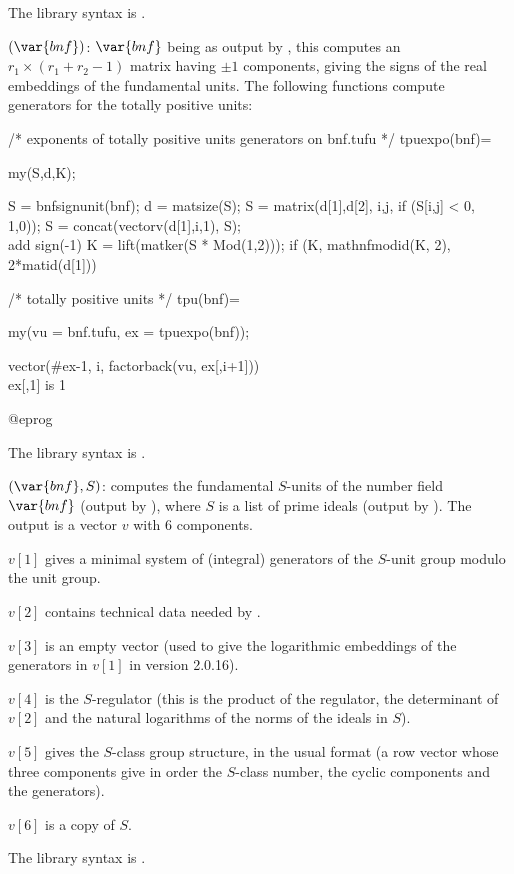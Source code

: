 The library syntax is .

$(\var{bnf})$: \label{se:bnfsignunit}$\var{bnf}$ being as output by
, this computes an $r_1\times(r_1+r_2-1)$ matrix having $\pm1$
components, giving the signs of the real embeddings of the fundamental units.
The following functions compute generators for the totally positive units:

\bprog
/* exponents of totally positive units generators on bnf.tufu */
tpuexpo(bnf)=
{ my(S,d,K);

  S = bnfsignunit(bnf); d = matsize(S);
  S = matrix(d[1],d[2], i,j, if (S[i,j] < 0, 1,0));
  S = concat(vectorv(d[1],i,1), S);   \\ add sign(-1)
  K = lift(matker(S * Mod(1,2)));
  if (K, mathnfmodid(K, 2), 2*matid(d[1]))
}

/* totally positive units */
tpu(bnf)=
{ my(vu = bnf.tufu, ex = tpuexpo(bnf));

  vector(#ex-1, i, factorback(vu, ex[,i+1]))  \\ ex[,1] is 1
}
@eprog

The library syntax is .

$(\var{bnf},S)$: \label{se:bnfsunit}computes the fundamental $S$-units of the
number field $\var{bnf}$ (output by ), where $S$ is a list of
prime ideals (output by ). The output is a vector $v$ with
6 components.

$v[1]$ gives a minimal system of (integral) generators of the $S$-unit group
modulo the unit group.

$v[2]$ contains technical data needed by .

$v[3]$ is an empty vector (used to give the logarithmic embeddings of the
generators in $v[1]$ in version 2.0.16).

$v[4]$ is the $S$-regulator (this is the product of the regulator, the
determinant of $v[2]$ and the natural logarithms of the norms of the ideals
in $S$).

$v[5]$ gives the $S$-class group structure, in the usual format
(a row vector whose three components give in order the $S$-class number,
the cyclic components and the generators).

$v[6]$ is a copy of $S$.

The library syntax is .

